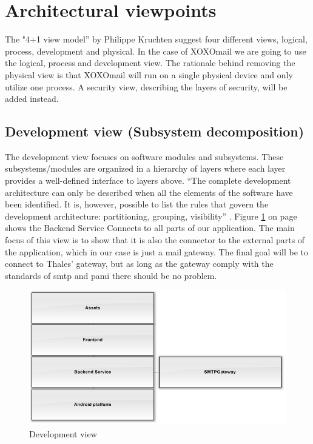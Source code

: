 \section{Architectural viewpoints}
The "4+1 view model'' \cite{bib:vm} by Philippe Kruchten suggest four different views, logical, process, development and physical. In the case of XOXOmail we are going to use the logical, process and development view. The rationale behind removing the physical view is that XOXOmail will run on a single physical device and only utilize one process. A security view, describing the layers of security, will be added instead.

\subsection{Development view (Subsystem decomposition)}
The development view focuses on software modules and subsystems. These subsystems/modules are organized in a hierarchy of layers where each layer provides a well-defined interface to layers above. 
\newline
\newline
``The complete development architecture can only be described when all the elements of the software have been identified. It is, however, possible to list the rules that govern the development architecture: partitioning, grouping, visibility'' \cite{bib:vm}. 
\newline
\newline
Figure \ref{fig:developmentview} on page \pageref{fig:developmentview} shows the Backend Service Connects to all parts of our application. The main focus of this view is to show that it is also the connector to the external parts of the application, which in our case is just a mail gateway. The final goal will be to connect to Thales' gateway, but as long as the gateway comply with the standards of \gls{smtp} and \gls{pami} there should be no problem.

\begin{figure}[H]
	\includegraphics[width=\textwidth]{developmentview.png}
	\caption{Development view}
	\label{fig:developmentview}
\end{figure}

